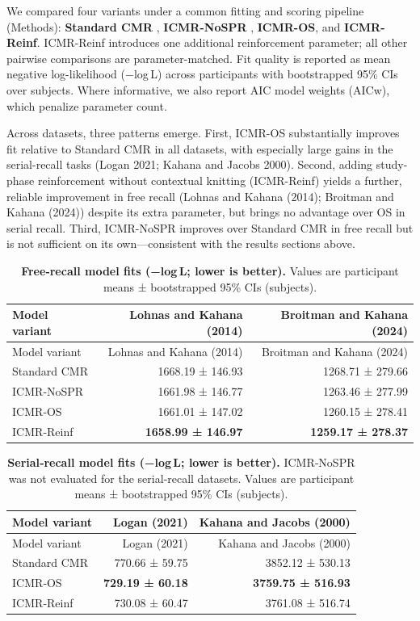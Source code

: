 \documentclass[
  letterpaper,
  11pt,
  english,
  singlespacing,
  headsepline]{MastersDoctoralThesis}
\begin{document}
We compared four variants under a common fitting and scoring pipeline
(Methods): \textbf{Standard CMR} , \textbf{ICMR-NoSPR} ,
\textbf{ICMR-OS}, and \textbf{ICMR-Reinf}. ICMR-Reinf introduces one
additional reinforcement parameter; all other pairwise comparisons are
parameter-matched. Fit quality is reported as mean negative
log-likelihood (−log\,L) across participants with bootstrapped 95\% CIs
over subjects. Where informative, we also report AIC model weights
(AICw), which penalize parameter count.

Across datasets, three patterns emerge. First, ICMR-OS substantially
improves fit relative to Standard CMR in all datasets, with especially
large gains in the serial-recall tasks (Logan 2021; Kahana and Jacobs
2000). Second, adding study-phase reinforcement without contextual
knitting (ICMR-Reinf) yields a further, reliable improvement in free
recall (Lohnas and Kahana (2014); Broitman and Kahana (2024)) despite
its extra parameter, but brings no advantage over OS in serial recall.
Third, ICMR-NoSPR improves over Standard CMR in free recall but is not
sufficient on its own---consistent with the results sections above.

\begin{longtable}[]{@{}lrr@{}}
\caption{\textbf{Free‑recall model fits (−log\,L; lower is better).}
Values are participant means ± bootstrapped 95\% CIs
(subjects).}\label{tbl-fit-fr}\tabularnewline
\toprule\noalign{}
Model variant & Lohnas and Kahana (2014) & Broitman and Kahana (2024) \\
\midrule\noalign{}
\endfirsthead
\toprule\noalign{}
Model variant & Lohnas and Kahana (2014) & Broitman and Kahana (2024) \\
\midrule\noalign{}
\endhead
\bottomrule\noalign{}
\endlastfoot
Standard CMR & 1668.19 ± 146.93 & 1268.71 ± 279.66 \\
ICMR‑NoSPR & 1661.98 ± 146.77 & 1263.46 ± 277.99 \\
ICMR‑OS & 1661.01 ± 147.02 & 1260.15 ± 278.41 \\
ICMR‑Reinf & \textbf{1658.99 ± 146.97} & \textbf{1259.17 ± 278.37} \\
\end{longtable}

\begin{longtable}[]{@{}lrr@{}}
\caption{\textbf{Serial‑recall model fits (−log\,L; lower is better).}
ICMR‑NoSPR was not evaluated for the serial‑recall datasets. Values are
participant means ± bootstrapped 95\% CIs
(subjects).}\label{tbl-fit-sr}\tabularnewline
\toprule\noalign{}
Model variant & Logan (2021) & Kahana and Jacobs (2000) \\
\midrule\noalign{}
\endfirsthead
\toprule\noalign{}
Model variant & Logan (2021) & Kahana and Jacobs (2000) \\
\midrule\noalign{}
\endhead
\bottomrule\noalign{}
\endlastfoot
Standard CMR & 770.66 ± 59.75 & 3852.12 ± 530.13 \\
ICMR‑OS & \textbf{729.19 ± 60.18} & \textbf{3759.75 ± 516.93} \\
ICMR‑Reinf & 730.08 ± 60.47 & 3761.08 ± 516.74 \\
\end{longtable}
\end{document}

